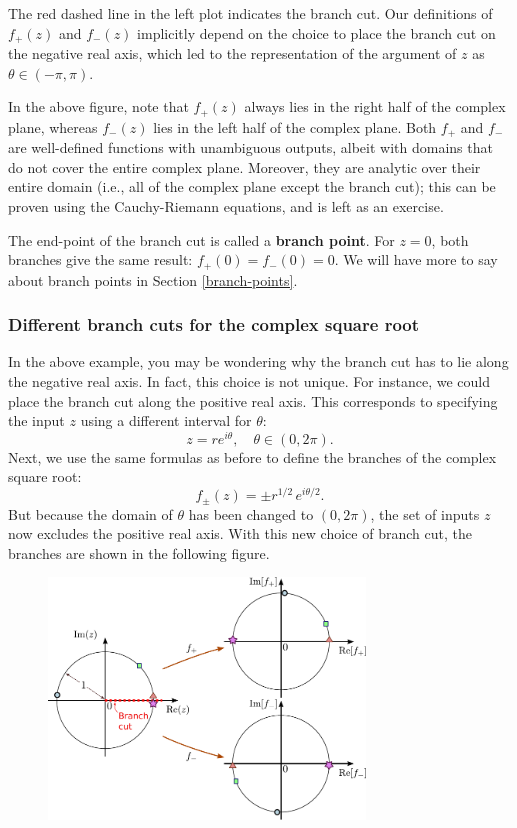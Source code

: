\documentclass[10pt,a4paper]{article}
\begin{document}
The red dashed line in the left plot indicates the branch cut. Our
definitions of $f_+(z)$ and $f_-(z)$ implicitly depend on the choice
to place the branch cut on the negative real axis, which led to the
representation of the argument of $z$ as $\theta \in (-\pi,\pi)$.

In the above figure, note that $f_+(z)$ always lies in the right half
of the complex plane, whereas $f_-(z)$ lies in the left half of the
complex plane.  Both $f_+$ and $f_-$ are well-defined functions with
unambiguous outputs, albeit with domains that do not cover the entire
complex plane.  Moreover, they are analytic over their entire domain
(i.e., all of the complex plane except the branch cut); this can be
proven using the Cauchy-Riemann equations, and is left as an exercise.

The end-point of the branch cut is called a \textbf{branch point}.
For $z = 0$, both branches give the same result: $f_+(0) = f_-(0) =
0$. We will have more to say about branch points in Section
\ref{branch-points}.

\subsubsection{Different branch cuts for the complex square root}
\label{different-branch-cuts-for-the-complex-square-root}

In the above example, you may be wondering why the branch cut has to
lie along the negative real axis. In fact, this choice is not
unique. For instance, we could place the branch cut along the positive
real axis. This corresponds to specifying the input $z$ using a
different interval for $\theta$:
\begin{equation}
z = re^{i\theta}, \quad \theta \in (0, 2\pi).
\end{equation}
Next, we use the same formulas as before to define the branches of the
complex square root:
\begin{equation}
f_\pm(z) = \pm r^{1/2} \, e^{i\theta/2}.
\end{equation}
But because the domain of $\theta$ has been changed to $(0, 2\pi)$,
the set of inputs $z$ now excludes the positive real axis. With this
new choice of branch cut, the branches are shown in the following
figure.

\begin{figure}[h]
  \centering\includegraphics[width=0.75\textwidth]{complex_root_2}
\end{figure}
\end{document}
